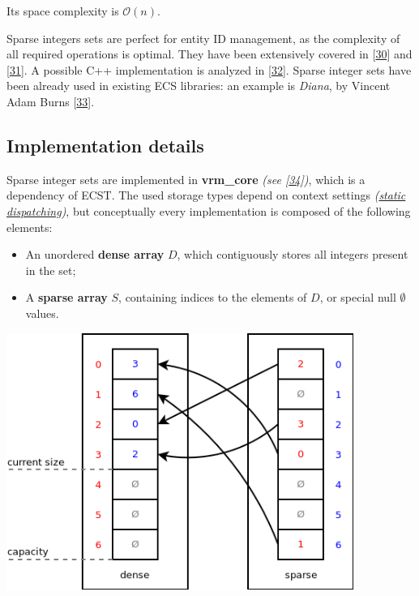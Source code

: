 \documentclass[oneside, 12pt, a4paper, openany]{book}
\let\origfigure=\figure
\let\endorigfigure=\endfigure
\renewenvironment{figure}[1][]{%
\origfigure[H]
}{%
\endorigfigure
}
\begin{document}
Its space complexity is \(\mathcal{O}(n)\).

Sparse integers sets are perfect for entity ID management, as the
complexity of all required operations is optimal. They have been
extensively covered in {[}\protect\hyperlink{ref-sparsesets132}{30}{]}
and {[}\protect\hyperlink{ref-sparsesets_praxis}{31}{]}. A possible C++
implementation is analyzed in
{[}\protect\hyperlink{ref-sparsesets_cpp}{32}{]}. Sparse integer sets
have been already used in existing ECS libraries: an example is
\emph{Diana}, by Vincent Adam Burns
{[}\protect\hyperlink{ref-github_diana}{33}{]}.

\subsection{Implementation details}\label{implementation-details-4}

Sparse integer sets are implemented in \textbf{vrm\_core} \emph{(see
{[}\protect\hyperlink{ref-github_vrmcore}{34}{]})}, which is a
dependency of ECST. The used storage types depend on context settings
\emph{(\protect\hyperlink{appendix_static_dispatching}{static
dispatching})}, but conceptually every implementation is composed of the
following elements:

\begin{itemize}
\item
  An unordered \textbf{dense array} \(D\), which contiguously stores all
  integers present in the set;
\item
  A \textbf{sparse array} \(S\), containing indices to the elements of
  \(D\), or special null \(\emptyset\) values.
\end{itemize}

\begin{figure}
\centering
\includegraphics[width=0.85000\textwidth]{source/figures/sparseset.png}
\caption{ECST miscellaneous: fixed sparse integer set
example}\label{sparsesetexample}
\end{figure}
\end{document}
